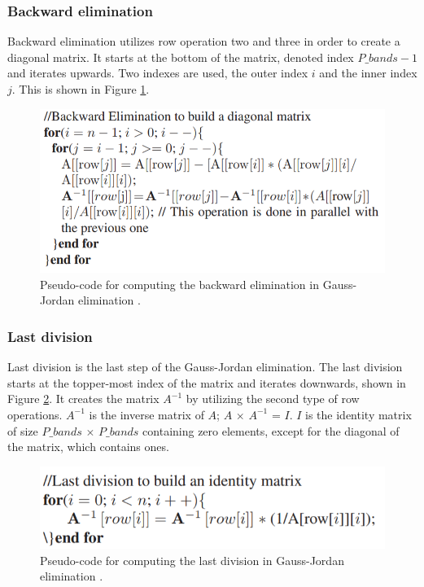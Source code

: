 \subsubsection{Backward elimination}
Backward elimination utilizes row operation two and three in order to create a diagonal matrix. It starts at the bottom of the matrix, denoted index $P\_bands-1$ and iterates upwards. Two indexes are used, the outer index $i$ and the inner index $j$. This is shown in Figure \ref{fig:backward_elimination_pseudocode}.

\begin{figure}[H]
\centering
   \includegraphics[scale=0.5]{images/backward_elimination_pseudocode.png}
  \caption{ Pseudo-code for computing the backward elimination in Gauss-Jordan elimination \cite{gauss_jordan_fpga}. } 
  \label{fig:backward_elimination_pseudocode}
\end{figure}


\subsubsection{Last division}
Last division is the last step of the Gauss-Jordan elimination. The last division starts at the topper-most index of the matrix and iterates downwards, shown in Figure \ref{fig:last_division_pseudocode}. It creates the matrix $A^{-1}$ by utilizing the second type of row operations. $A^{-1}$ is the inverse matrix of $A$; $A$ $\times$ $A^{-1}$ = $I$. $I$ is the identity matrix of size $P\_bands$ $\times$ $P\_bands$ containing zero elements, except for the diagonal of the matrix, which contains ones. 
\begin{figure}[H]
\centering
   \includegraphics[scale=0.5]{images/last_division_pseudocode.png}
  \caption{ Pseudo-code for computing the last division in Gauss-Jordan elimination \cite{gauss_jordan_fpga}. } 
  \label{fig:last_division_pseudocode}
\end{figure}

